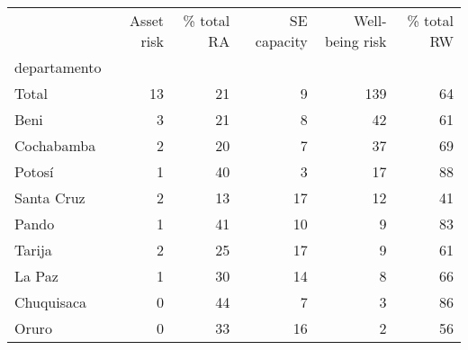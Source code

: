 \begin{tabular}{lrrrrr}
\toprule
{} &  Asset risk &  \% total RA &  SE capacity &  Well-being risk &  \% total RW \\
departamento &             &             &              &                  &             \\
\midrule
Total        &          13 &          21 &            9 &              139 &          64 \\
Beni         &           3 &          21 &            8 &               42 &          61 \\
Cochabamba   &           2 &          20 &            7 &               37 &          69 \\
Potosí       &           1 &          40 &            3 &               17 &          88 \\
Santa Cruz   &           2 &          13 &           17 &               12 &          41 \\
Pando        &           1 &          41 &           10 &                9 &          83 \\
Tarija       &           2 &          25 &           17 &                9 &          61 \\
La Paz       &           1 &          30 &           14 &                8 &          66 \\
Chuquisaca   &           0 &          44 &            7 &                3 &          86 \\
Oruro        &           0 &          33 &           16 &                2 &          56 \\
\bottomrule
\end{tabular}
